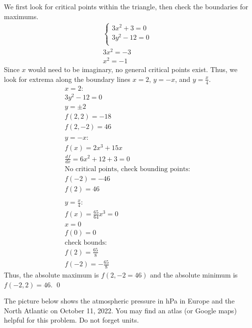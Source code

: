 \documentclass[12pt]{exam}
\begin{document}
\begin{questions}
\begin{solution}
\begin{center}
		\end{center}
		We first look for critical points within the triangle, then check the boundaries for maximums.
		\begin{gather*}
			\begin{cases}
				3x^2 + 3 = 0 \\
				3y^2 - 12 = 0 \\
			\end{cases} \\
			3x^2 = -3 \\
			x^2 = -1
		\end{gather*}
		Since $x$ would need to be imaginary, no general critical points exist. Thus, we look for extrema along the boundary lines $x=2$, $y=-x$, and $y=\frac{x}{4}$. 
		\begin{gather*}
			x=2: \\
			3y^2 - 12 = 0 \\
			y=\pm 2 \\
			f(2, 2) = -18 \\
			f(2, -2) = 46 \\
			\\
			y=-x: \\
			f(x) = 2x^3+15x \\
			\frac{df}{dx} = 6x^2+12+3=0 \\
			\text{No critical points, check bounding points:}\\
			f(-2) = -46 \\
			f(2) = 46 \\
			\\
			y=\frac{x}{4}: \\
			f(x) = \frac{65}{64}x^3=0 \\
			x=0 \\
			f(0) = 0 \\
			\text{check bounds:} \\
			f(2) = \frac{65}{8} \\
			f(-2) = -\frac{65}{8}
		\end{gather*}
		Thus, the absolute maximum is $\boxed{f(2, -2 = 46)}$ and the absolute minimum is
		\\ $\boxed{f(-2, 2) = 46}$. \qed
	\end{solution}
\clearpage
\question The picture below shows the atmospheric pressure in hPa in Europe and the North Atlantic on October 11, 2022. You may find an atlas (or Google maps) helpful for this problem. Do not forget units.

\end{questions}
\end{document}
